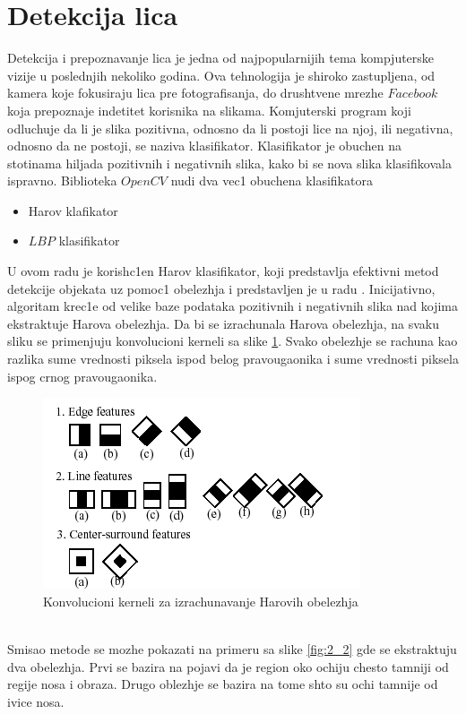 \documentclass[a4paper, openany, oneside, 11pt]{book}
\begin{document}
\section{Detekcija lica}\label{detekcijalica}
Detekcija i prepoznavanje lica je jedna od najpopularnijih tema kompjuterske vizije u poslednjih nekoliko godina. Ova tehnologija je shiroko zastupljena, od kamera koje fokusiraju lica pre fotografisanja, do drushtvene mrezhe $Facebook$ koja prepoznaje  indetitet korisnika na slikama. Komjuterski program koji odlu\-chuje da li je slika pozitivna, odnosno da li postoji lice na njoj, ili negativna, odnosno da ne postoji, se naziva klasifikator. Klasifikator je obuchen na stotinama hiljada pozitivnih i negativnih slika, kako bi se nova slika klasifikovala ispravno. Biblioteka $OpenCV$ \cite{Opencv} nudi dva vec1 obuchena klasifikatora
\begin{itemize}
\item Harov klafikator
\item $LBP$ klasifikator
\end{itemize}
U ovom radu je korish\-c1en Harov klasifikator, koji predstavlja efektivni metod detekcije objekata uz pomoc1 obelezhja i predstavljen je u radu \cite{Haar}. Inicijativno, algoritam krec1e od velike baze podataka pozitivnih i negativnih slika nad kojima ekstraktuje Harova obelezhja. Da bi se izrachunala Harova obelezhja, na svaku sliku se primenjuju konvolucioni kerneli sa slike \ref{fig:2_1}. Svako obelezhje se rachuna kao razlika sume vrednosti piksela ispod belog pravougaonika i sume vrednosti piksela ispog crnog pravougaonika.
\begin{figure}[h!]
\centering
  \includegraphics[scale=0.6]{res/haar_kernels.png}
  \caption{Konvolucioni kerneli za izrachunavanje Harovih obelezhja}
  \label{fig:2_1}
  \vspace{0pt}
\end{figure}\\
Smisao metode se mozhe pokazati na primeru sa slike \ref{fig:2_2} gde se ekstraktuju dva obelezhja. Prvi se bazira na pojavi da je region oko ochiju chesto tamniji od regije nosa i obraza. Drugo oblezhje se bazira na tome shto su ochi tamnije od ivice nosa.
\end{document}
